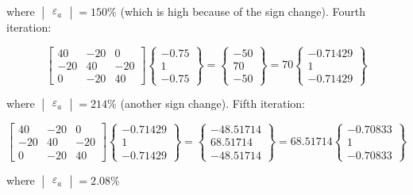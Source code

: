 \documentclass[../main.tex]{subfiles}
\begin{document}
where $\begin{vmatrix}
\varepsilon _{a}
\end{vmatrix}=150\%$  (which is high because of the sign change).
Fourth iteration:

\begin{equation}
\begin{bmatrix}
40 & -20 &0 \\
-20 & 40 & -20\\
 0& -20 & 40
\end{bmatrix}
\begin{Bmatrix}
-0.75\\
1\\
-0.75
\end{Bmatrix}=\begin{Bmatrix}
-50\\
70\\
-50
\end{Bmatrix}=70\begin{Bmatrix}
-0.71429\\
1\\
-0.71429
\end{Bmatrix}
\end{equation}

where $\begin{vmatrix}
\varepsilon _{a}
\end{vmatrix}=214\%$  (another sign change).
Fifth iteration:

\begin{equation}
\begin{bmatrix}
40 & -20 & 0\\
-20 & 40 & -20\\
0 & -20 & 40
\end{bmatrix}\begin{Bmatrix}
-0.71429\\
1\\
-0.71429
\end{Bmatrix}=\begin{Bmatrix}
-48.51714\\
68.51714\\
-48.51714
\end{Bmatrix}=68.51714\begin{Bmatrix}
-0.70833\\
1\\
-0.70833
\end{Bmatrix}
\end{equation}

where $\begin{vmatrix}
\varepsilon _{a}
\end{vmatrix}=2.08\%$
\end{document}
